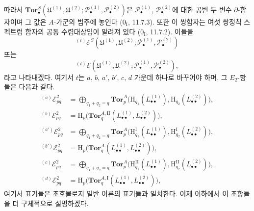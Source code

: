 \begin{env}[6.6.2]
따라서
$\mathbf{Tor}_\bullet^S
(\mathfrak U^{(1)},\mathfrak U^{(2)};
 \mathscr P_\bullet^{(1)},\mathscr P_\bullet^{(2)})$은
$\mathscr P_\bullet^{(1)}$, $\mathscr P_\bullet^{(2)}$에 대한 공변
두 변수 $\partial$-함자이며 그 값은 $A$-가군의 범주에 놓인다
($0_{\mathrm I}$, 11.7.3). 또한 이 쌍함자는 여섯 쌍정칙 스펙트럼
함자의 공통 수렴대상임이 알려져 있다 ($0_{\mathrm I}$, 11.7.2).
이들을
\[
  {}^{(t)}\mathscr E^S
  (\mathfrak U^{(1)},\mathfrak U^{(2)};
   \mathscr P_\bullet^{(1)},\mathscr P_\bullet^{(2)})
\]
또는
\[
  {}^{(t)}\mathscr E
  (\mathfrak U^{(1)},\mathfrak U^{(2)};
   \mathscr P_\bullet^{(1)},\mathscr P_\bullet^{(2)}),
\]
라고 나타내겠다. 여기서 $t$는 $a$, $b$, $a'$, $b'$, $c$, $d$
가운데 하나로 바꾸어야 하며, 그 $E_2$-항들은 다음과 같다.
\[
\begin{aligned}
  {}^{(a)}\mathscr E_{pq}^2
  &=\bigoplus_{q_1+q_2=q}
    \mathbf{Tor}_p^A
    \bigl(\mathrm H_{q_1}(L_{\bullet\bullet}^{(1)}),
          \mathrm H_{q_2}(L_{\bullet\bullet}^{(2)})\bigr),\\
  {}^{(b)}\mathscr E_{pq}^2
  &=\mathrm H_p\bigl(
    \mathbf{Tor}_q^{A,\mathrm{II}}
    (L_{\bullet\bullet}^{(1)},L_{\bullet\bullet}^{(2)})\bigr),\\
  {}^{(a')}\mathscr E_{pq}^2
  &=\bigoplus_{q_1+q_2=q}
    \mathbf{Tor}_p^A
    \bigl(\mathrm H_{q_1}^{\mathrm I}(L_{\bullet\bullet}^{(1)}),
          \mathrm H_{q_2}^{\mathrm I}(L_{\bullet\bullet}^{(2)})\bigr),\\
  {}^{(b')}\mathscr E_{pq}^2
  &=\mathrm H_p\bigl(
    \mathbf{Tor}_q^A
    (L_{\bullet\bullet}^{(1)},L_{\bullet\bullet}^{(2)})\bigr),\\
  {}^{(c)}\mathscr E_{pq}^2
  &=\bigoplus_{q_1+q_2=q}
    \mathbf{Tor}_p^A
    \bigl(\mathrm H_{q_1}^{\mathrm{II}}(L_{\bullet\bullet}^{(1)}),
          \mathrm H_{q_2}^{\mathrm{II}}(L_{\bullet\bullet}^{(2)})\bigr),\\
  {}^{(d)}\mathscr E_{pq}^2
  &=\mathrm H_p\bigl(
    \mathbf{Tor}_q^{A,\mathrm I}
    (L_{\bullet\bullet}^{(1)},L_{\bullet\bullet}^{(2)})\bigr),
\end{aligned}
\]
여기서 표기들은 초호몰로지 일반 이론의 표기들과 일치한다. 이제
이하에서 이 초항들을 더 구체적으로 설명하겠다.
\end{env}

